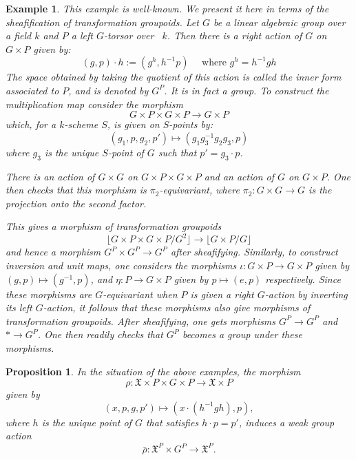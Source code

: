\documentclass[10pt,a4paper]{amsart}
\newtheorem{example}{Example}
\newtheorem{proposition}{Proposition}
\newcommand{\fX}{{\mathfrak X}}
\newcommand{\trans}[1]{{\lfloor #1 \rfloor}}
\begin{document}
\begin{example}\label{e:inner} This example is well-known. We present it here in terms of the sheafification of transformation groupoids. 
    Let $G$ be a linear algebraic group over a field $k$ and $P$ a left $G$-torsor over ~$k$. 
    Then there is a right action of $G$ on $G \times P$ given by:
    $$
    (g,p) \cdot h := (g^h,h^{-1}p) \quad \text{ where } g^{h}=h^{-1}gh 
    $$
    The space obtained by taking the quotient of this action is called the \emph{inner form}
    associated to $P$, and is denoted by $G^{P}$. It is in fact a group. To construct the 
    multiplication map consider the morphism 
    $$
    G\times P \times G\times P \to G\times P
    $$
    which, for a $k$-scheme $S$, is given on $S$-points by:
    $$
    (g_{1},p,g_{2}, p') \mapsto (g_{1} g_{3}^{-1}g_{2}g_3,p)
    $$ where $g_3$ is the unique $S$-point of $G$ such that $p' = g_3\cdot p$. 

    There is an action of $G \times G$ on $G\times P\times G\times P$ and an action of 
    $G$ on $G\times P$. One then checks that this morphism is $\pi_{2}$-equivariant, where 
    $\pi_2:G\times G\to G$ is the projection onto the second factor. 

    This gives a morphism of transformation groupoids 
    $$
    \trans{G\times P\times G \times P/G^2}\to \trans{G\times P/G}
    $$
    and hence a morphism $G^{P}\times G^{P}\to G^{P}$ after sheafifying. 
    Similarly, to construct inversion and unit maps, one considers the morphisms 
    $\iota:G \times P \to G \times P$ given by $(g,p) \mapsto (g^{-1},p)$, and 
    $\eta:P \to G \times P$ given by $p \mapsto (e,p)$ respectively. Since these
    morphisms are $G$-equivariant when $P$ is given a right $G$-action by 
    inverting its left $G$-action, it follows that these morphisms also give 
    morphisms of transformation groupoids. After sheafifying, one gets 
    morphisms $G^P \to G^P$ and $* \to G^P$. One then readily checks that 
    $G^{P}$ becomes a group under these morphisms.
\end{example}

\begin{proposition}\label{p:innerAction}
    In the situation of the above examples,
    the morphism 
    $$
    \rho :  \fX\times P \times  G\times P\to \fX\times P
    $$
    given by 
    $$
    (x,p,g,p')\mapsto (x\cdot (h^{-1}gh),p), 
    $$ where $h$ is the unique point of $G$ that satisfies $h\cdot p = p'$,
    induces a weak group action 
    $$
    \bar{\rho}: \fX^{P}\times G^{P}\to \fX^{P}.
    $$
\end{proposition}
\end{document}
